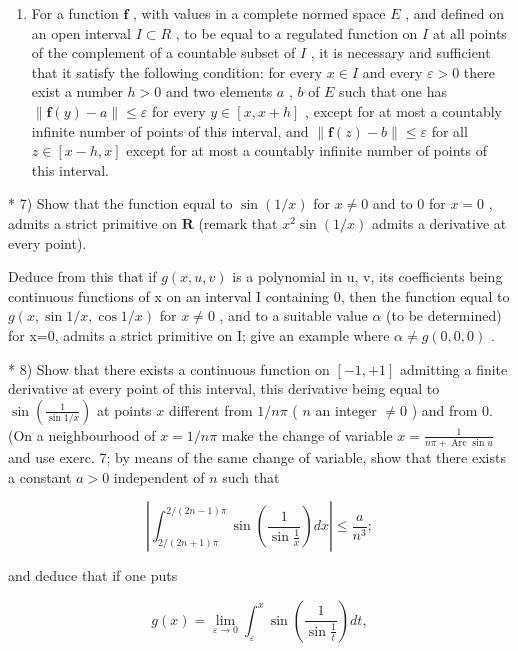 \begin{enumerate}
\def\labelenumi{\arabic{enumi})}
\setcounter{enumi}{5}
\tightlist
\item
  For a function \(\mathbf{f}\) , with values in a complete normed space \(E\) , and defined on an open interval \(I \subset R\) , to be equal to a regulated function on \(I\) at all points of the complement of a countable subset of \(I\) , it is necessary and sufficient that it satisfy the following condition: for every \(x \in I\) and every \(\varepsilon > 0\) there exist a number \(h > 0\) and two elements \(a\) , \(b\) of \(E\) such that one has \(\| \mathbf{f}(y) - a \| \leqslant \varepsilon\) for every \(y \in [x, x + h]\) , except for at most a countably infinite number of points of this interval, and \(\| \mathbf{f}(z) - b \| \leqslant \varepsilon\) for all \(z \in [x - h, x]\) except for at most a countably infinite number of points of this interval.
\end{enumerate}

* 7) Show that the function equal to \(\sin(1/x)\) for \(x \neq 0\) and to 0 for \(x = 0\) , admits a strict primitive on \(\mathbf{R}\) (remark that \(x^2 \sin(1/x)\) admits a derivative at every point).

Deduce from this that if \(g(x,u,v)\) is a polynomial in u, v, its coefficients being continuous functions of x on an interval I containing 0, then the function equal to \(g(x,\sin1/x,\cos1/x)\) for \(x\neq0\) , and to a suitable value \(\alpha\) (to be determined) for x=0, admits a strict primitive on I; give an example where \(\alpha\neq g(0,0,0)\) .

* 8) Show that there exists a continuous function on \([-1, +1]\) admitting a finite derivative at every point of this interval, this derivative being equal to \(\sin\left(\frac{1}{\sin 1/x}\right)\) at points \(x\) different from \(1/n\pi\) ( \(n\) an integer \(\neq 0\) ) and from 0. (On a neighbourhood of \(x = 1/n\pi\) make the change of variable \(x = \frac{1}{n\pi + \operatorname{Arc} \sin u}\) and use exerc. 7; by means of the same change of variable, show that there exists a constant \(a > 0\) independent of \(n\) such that

\[
\left| \int_ {2 / (2 n + 1) \pi} ^ {2 / (2 n - 1) \pi} \sin \left(\frac {1}{\sin \frac {1}{x}}\right) d x \right| \leqslant \frac {a}{n ^ {3}};
\]

and deduce that if one puts

\[
g (x) = \lim _ {\varepsilon \rightarrow 0} \int_ {\varepsilon} ^ {x} \sin \left(\frac {1}{\sin \frac {1}{t}}\right) d t,
\]

